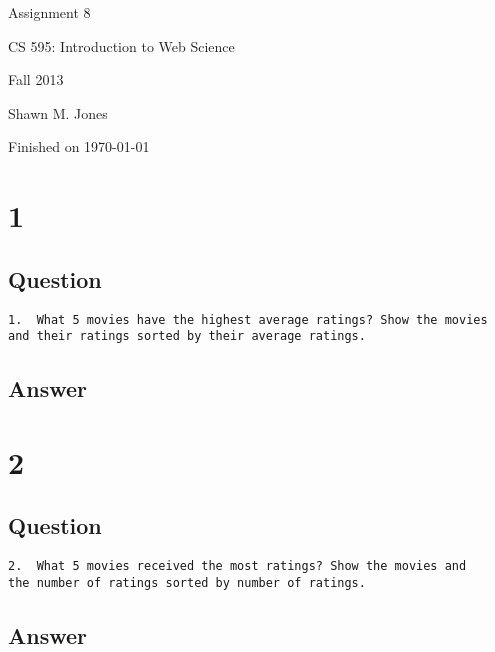 \documentclass[letterpaper,11pt]{article}
\begin{document}
\begin{titlepage}

\begin{center}

\Huge{Assignment 8}

\Large{CS 595:  Introduction to Web Science}

\Large{Fall 2013}

\Large{Shawn M. Jones}

\Large Finished on \today

\end{center}

\end{titlepage}

\newpage


\newpage
\section*{1}

\subsection*{Question}

\begin{verbatim}
1.  What 5 movies have the highest average ratings? Show the movies
and their ratings sorted by their average ratings.
\end{verbatim}

\newpage
\subsection*{Answer}


\newpage

\section*{2}

\subsection*{Question}

\begin{verbatim}
2.  What 5 movies received the most ratings? Show the movies and
the number of ratings sorted by number of ratings.
\end{verbatim}

\newpage
\subsection*{Answer}
\end{document}
